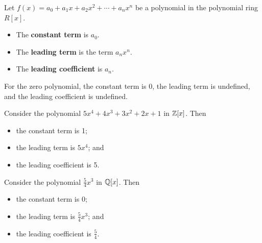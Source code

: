 \begin{definition}
    Let $f(x) = a_0 + a_1x + a_2x^2 + \cdots + a_nx^n$ be a polynomial in the polynomial ring $R[x]$.
    \begin{itemize}
        \item The \textbf{constant term} is $a_0$.
        \item The \textbf{leading term} is the term $a_nx^n$.
        \item The \textbf{leading coefficient} is $a_n$.
    \end{itemize}
\end{definition}
\begin{remark}
    For the zero polynomial, the constant term is 0, the leading term is undefined, and the leading coefficient is undefined.
\end{remark}
\begin{example}
    Consider the polynomial $5x^4 + 4x^3 + 3x^2 + 2x + 1$ in $\mathbb{Z}[x]$. Then
    \begin{itemize}
        \item the constant term is 1;
        \item the leading term is $5x^4$; and
        \item the leading coefficient is 5.
    \end{itemize}
\end{example}
\begin{example}
    Consider the polynomial $\frac54x^3$ in $\mathbb{Q}[x]$. Then
    \begin{itemize}
        \item the constant term is 0;
        \item the leading term is $\frac54x^3$; and
        \item the leading coefficient is $\frac54$.
    \end{itemize}
\end{example}

